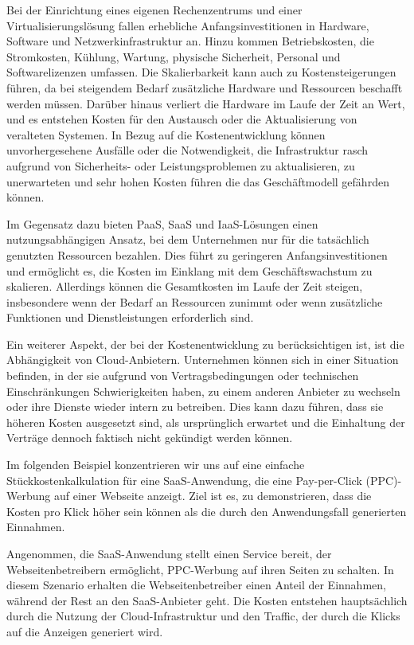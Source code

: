 Bei der Einrichtung eines eigenen Rechenzentrums und einer Virtualisierungslösung fallen erhebliche Anfangsinvestitionen in Hardware, Software und Netzwerkinfrastruktur an. Hinzu kommen Betriebskosten, die Stromkosten, Kühlung, Wartung, physische Sicherheit, Personal und Softwarelizenzen umfassen. Die Skalierbarkeit kann auch zu Kostensteigerungen führen, da bei steigendem Bedarf zusätzliche Hardware und Ressourcen beschafft werden müssen. Darüber hinaus verliert die Hardware im Laufe der Zeit an Wert, und es entstehen Kosten für den Austausch oder die Aktualisierung von veralteten Systemen. In Bezug auf die Kostenentwicklung können unvorhergesehene Ausfälle oder die Notwendigkeit, die Infrastruktur rasch aufgrund von Sicherheits- oder Leistungsproblemen zu aktualisieren, zu unerwarteten und sehr hohen Kosten führen die das Geschäftmodell gefährden können.

Im Gegensatz dazu bieten PaaS, SaaS und IaaS-Lösungen einen nutzungsabhängigen Ansatz, bei dem Unternehmen nur für die tatsächlich genutzten Ressourcen bezahlen. Dies führt zu geringeren Anfangsinvestitionen und ermöglicht es, die Kosten im Einklang mit dem Geschäftswachstum zu skalieren. Allerdings können die Gesamtkosten im Laufe der Zeit steigen, insbesondere wenn der Bedarf an Ressourcen zunimmt oder wenn zusätzliche Funktionen und Dienstleistungen erforderlich sind.

Ein weiterer Aspekt, der bei der Kostenentwicklung zu berücksichtigen ist, ist die Abhängigkeit von Cloud-Anbietern. Unternehmen können sich in einer Situation befinden, in der sie aufgrund von Vertragsbedingungen oder technischen Einschränkungen Schwierigkeiten haben, zu einem anderen Anbieter zu wechseln oder ihre Dienste wieder intern zu betreiben. Dies kann dazu führen, dass sie höheren Kosten ausgesetzt sind, als ursprünglich erwartet und die Einhaltung der Verträge dennoch faktisch nicht gekündigt werden können.

Im folgenden Beispiel konzentrieren wir uns auf eine einfache Stückkostenkalkulation für eine SaaS-Anwendung, die eine Pay-per-Click (PPC)-Werbung auf einer Webseite anzeigt. Ziel ist es, zu demonstrieren, dass die Kosten pro Klick höher sein können als die durch den Anwendungsfall generierten Einnahmen.

Angenommen, die SaaS-Anwendung stellt einen Service bereit, der Webseitenbetreibern ermöglicht, PPC-Werbung auf ihren Seiten zu schalten. In diesem Szenario erhalten die Webseitenbetreiber einen Anteil der Einnahmen, während der Rest an den SaaS-Anbieter geht. Die Kosten entstehen hauptsächlich durch die Nutzung der Cloud-Infrastruktur und den Traffic, der durch die Klicks auf die Anzeigen generiert wird.

